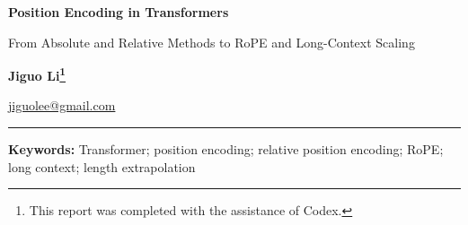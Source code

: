 \documentclass[UTF8,fontset=none,a4paper,10pt]{ctexart}
\begin{document}
\begin{center}
{\bfseries\color{navy} Position Encoding in Transformers}\par
  \vspace{4pt}
{\color{navy} From Absolute and Relative Methods to RoPE and Long-Context Scaling}\par
  \vspace{10pt}
{\normalsize\textbf{Jiguo Li\footnote{This report was completed with the assistance of Codex.}}}\par
  \vspace{2pt}
  {\small\href{mailto:jiguolee@gmail.com}{jiguolee@gmail.com}}
\end{center}
\vspace{5pt}
\hrule

\begin{abstract}
Self-attention models content-dependent interactions between tokens but does not by itself encode token order. Position encoding addresses this limitation by introducing absolute coordinates, relative distances, or position-dependent rotations into Transformer representations and attention scores. This technical survey develops a unified account of sinusoidal and learned absolute position embeddings, Shaw-style relative position representations, Transformer-XL, T5 relative position bias, ALiBi, and Rotary Position Embeddings (RoPE). We derive how RoPE converts absolute position indices into relative phase differences in Query-Key inner products and compare these methods in terms of where position is injected, computational cost, compatibility with KV caching, and length extrapolation. We then examine long-context extensions, including Position Interpolation, RoPE scaling laws, NTK-aware scaling, Dynamic NTK, NTK-by-parts, YaRN, LongRoPE, and LongRoPE2, with emphasis on frequency allocation, attention rescaling, training length, and target context length. We also summarize implementation considerations, evaluation protocols, and position-encoding choices in representative large language models. A central conclusion is that the ability to compute positional features beyond the training length does not imply reliable long-context generalization; context extension must be evaluated through short-context retention, position-wise perplexity, retrieval, reasoning, and long-context code tasks.
\end{abstract}

\noindent\textbf{Keywords:} Transformer; position encoding; relative position encoding; RoPE; long context; length extrapolation
\end{document}
